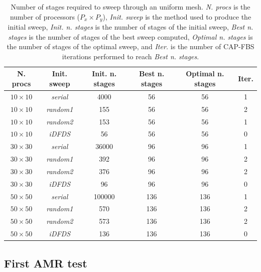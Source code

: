\documentclass{mc2015}
\renewcommand{\(}{\left(}
\renewcommand{\)}{\right)}
\renewcommand{\[}{\left[}
\renewcommand{\]}{\right]}
\begin{document}
\begin{table}[H]
  \begin{center}
    \caption{Number of stages required to sweep through an uniform mesh.
      \emph{N. procs} is the number of processors ($P_x \times P_y$), \emph{Init. sweep} is the
      method used to produce the initial sweep, \emph{Init. n. stages} is the
      number of stages of the initial sweep, \emph{Best n. stages} is the
      number of stages of the best sweep computed, \emph{Optimal n. stages} is the
      number of stages of the optimal sweep, and \emph{Iter.} is the number
    of CAP-FBS iterations performed to reach \emph{Best n. stages}.}
    \begin{tabular}{|c|c|c|c|c|c|}
      \hline
      N. procs & Init. sweep & Init. n. stages & Best n. stages & Optimal n. stages & Iter. \\
      \hline
      $10\times 10$ & \emph{serial}  &   4000 &  56 &  56 & 1 \\
      $10\times 10$ & \emph{random1} &    155 &  56 &  56 & 2 \\
      $10\times 10$ & \emph{random2} &    153 &  56 &  56 & 1 \\
      $10\times 10$ & \emph{iDFDS}   &     56 &  56 &  56 & 0 \\
      $30\times 30$ & \emph{serial}  &  36000 &  96 &  96 & 1 \\
      $30\times 30$ & \emph{random1} &    392 &  96 &  96 & 2 \\
      $30\times 30$ & \emph{random2} &    376 &  96 &  96 & 2 \\
      $30\times 30$ & \emph{iDFDS}   &     96 &  96 &  96 & 0 \\
      $50\times 50$ & \emph{serial}  & 100000 & 136 & 136 & 1 \\
      $50\times 50$ & \emph{random1} &    570 & 136 & 136 & 2 \\ 
      $50\times 50$ & \emph{random2} &    573 & 136 & 136 & 2 \\
      $50\times 50$ & \emph{iDFDS}   &    136 & 136 & 136 & 0 \\
      \hline
    \end{tabular}
    \label{uniform}
  \end{center}
\end{table}

\subsection{First AMR test}
\end{document}
